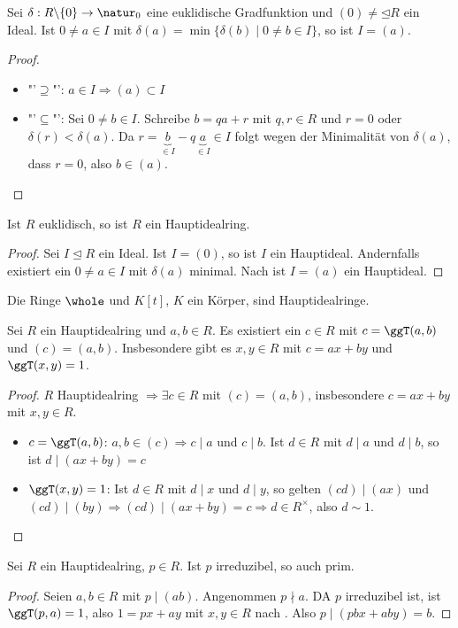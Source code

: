 \begin{lemma}
	Sei $\delta:R\backslash \{0\}\to \natur_0$ eine euklidische Gradfunktion und $(0)\neq\unlhd R$ ein Ideal. Ist $0\neq a\in I$ mit $\delta(a)=\min\{\delta(b)\mid 0\neq b\in I\}$, so ist $I=(a)$.
\end{lemma}
\begin{proof}
	\begin{itemize}
		\item "'$\supseteq$"': $a\in I\Rightarrow (a)\subset I$
		\item "'$\subseteq$"': Sei $0\neq b\in I$. Schreibe $b=qa+r$ mit $q,r\in R$ und $r=0$ oder $\delta(r)<\delta(a)$. Da $r=\underbrace{b}_{\in I}-q\underbrace{a}_{\in I}\in I$ folgt wegen der Minimalität von $\delta(a)$, dass $r=0$, also $b\in (a)$.
	\end{itemize}
\end{proof}

\begin{proposition}
	Ist $R$ euklidisch, so ist $R$ ein Hauptidealring.
\end{proposition}
\begin{proof}
	Sei $I\unlhd R$ ein Ideal. Ist $I=(0)$, so ist $I$ ein Hauptideal. Andernfalls existiert ein $0\neq a\in I$ mit $\delta(a)$ minimal. Nach  ist $I=(a)$ ein Hauptideal.
\end{proof}

\begin{conclusion}
	Die Ringe $\whole$ und $K[t]$, $K$ ein Körper, sind Hauptidealringe.
\end{conclusion}

\begin{lemma}
	Sei $R$ ein Hauptidealring und $a,b\in R$. Es existiert ein $c\in R$ mit $c=\ggT(a,b)$ und $(c)=(a,b)$. Insbesondere gibt es $x,y\in R$ mit $c=ax+by$ und $\ggT(x,y)=1$.
\end{lemma}
\begin{proof}
	$R$ Hauptidealring $\Rightarrow\exists c\in R$ mit $(c)=(a,b)$, insbesondere $c=ax+by$ mit $x,y\in R$.
	\begin{itemize}
		\item $c=\ggT(a,b)$: $a,b\in (c)\Rightarrow c\mid a$ und $c\mid b$. Ist $d\in R$ mit $d\mid a$ und $d\mid b$, so ist $d\mid (ax+by)=c$
		\item $\ggT(x,y)=1$: Ist $d\in R$ mit $d\mid x$ und $d\mid y$, so gelten $(cd)\mid (ax)$ und $(cd)\mid (by)\Rightarrow (cd)\mid (ax+by)=c\Rightarrow d\in R^\times$, also $d\sim 1$.
	\end{itemize}
\end{proof}

\begin{proposition}
	Sei $R$ ein Hauptidealring, $p\in R$. Ist $p$ irreduzibel, so auch prim.
\end{proposition}
\begin{proof}
	Seien $a,b\in R$ mit $p\mid (ab)$. Angenommen $p\nmid a$. DA $p$ irreduzibel ist, ist $\ggT(p,a)=1$, also $1=px+ay$ mit $x,y\in R$ nach . Also $p\mid (pbx+aby)=b$.
\end{proof}
